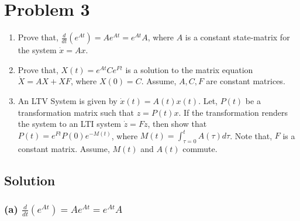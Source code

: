 \section*{Problem 3}

\begin{enumerate}[label= (\alph*)]
      \item Prove that, \( \frac{d}{d t}\left(e^{A t}\right)=A e^{A t}=e^{A t} A \), where \( A \) is a constant state-matrix for the system \( \dot{x}=A x \).
      \item Prove that, \( X(t)=e^{A t} C e^{F t} \) is a solution to the matrix equation \( \dot{X}=A X+X F \), where \( X(0)=C \).
            Assume, \( A, C, F \) are constant matrices.
      \item An LTV System is given by \( \dot{x}(t)=A(t) x(t) \). Let, \( P(t) \) be a transformation matrix such that \( z=P(t) x \).
            If the transformation renders the system to an LTI system \( \dot{z}=F z \), then show that \( P(t)=e^{F t} P(0) e^{-M(t)} \), where \( M(t)=\int_{\tau=0}^{t} A(\tau) d \tau \).
            Note that, \( F \) is a constant matrix.
            Assume, \( M(t) \) and \( A(t) \) commute.
\end{enumerate}

\subsection*{Solution}

\subsubsection*{(a) \( \frac{d}{d t}\left(e^{A t}\right)=A e^{A t}=e^{A t} A \)}

